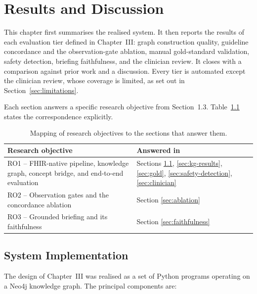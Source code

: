 \chapter{Results and Discussion}


This chapter first summarises the realised system. It then reports the results of each
evaluation tier defined in Chapter~III: graph construction quality, guideline concordance
and the observation-gate ablation, manual gold-standard validation, safety detection,
briefing faithfulness, and the clinician review. It closes with a comparison against prior
work and a discussion. Every tier is automated except the clinician review, whose coverage is
limited, as set out in Section~\ref{sec:limitations}.

Each section answers a specific research objective from Section~1.3.
Table~\ref{tab:ro-map} states the correspondence explicitly.

\begin{table}[h]
\centering
\caption{Mapping of research objectives to the sections that answer them.}
\label{tab:ro-map}
\begin{tabular}{@{}p{96mm}p{46mm}@{}}
\hline
\textbf{Research objective} & \textbf{Answered in} \\
\hline
RO1 -- FHIR-native pipeline, knowledge graph, concept bridge, and end-to-end evaluation
    & Sections \ref{sec:sys-impl}, \ref{sec:kg-results}, \ref{sec:gold},
      \ref{sec:safety-detection}, \ref{sec:clinician} \\
RO2 -- Observation gates and the concordance ablation
    & Section \ref{sec:ablation} \\
RO3 -- Grounded briefing and its faithfulness
    & Section \ref{sec:faithfulness} \\
\hline
\end{tabular}
\end{table}

\section{System Implementation}
\label{sec:sys-impl}

The design of Chapter~III was realised as a set of Python programs operating on a Neo4j
knowledge graph. The principal components are:

